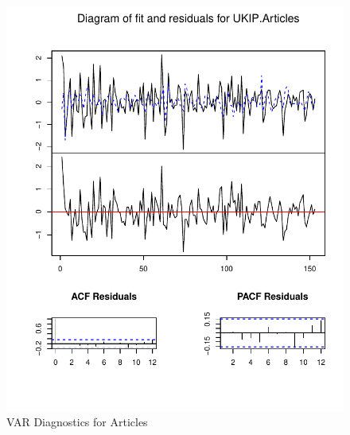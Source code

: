 \documentclass[12pt,]{article}
\makeatletter
\def\maxwidth{\ifdim\Gin@nat@width>\linewidth\linewidth
\else\Gin@nat@width\fi}
\let\Oldincludegraphics\includegraphics
\renewcommand{\includegraphics}[1]{\Oldincludegraphics[width=\maxwidth]{#1}}
\makeatother
\begin{document}
\begin{figure}[htbp]
\centering
\includegraphics{ukip_media_files/var-plot-articles.pdf}
\caption{VAR Diagnostics for Articles}
\end{figure}

\pagebreak
\end{document}
